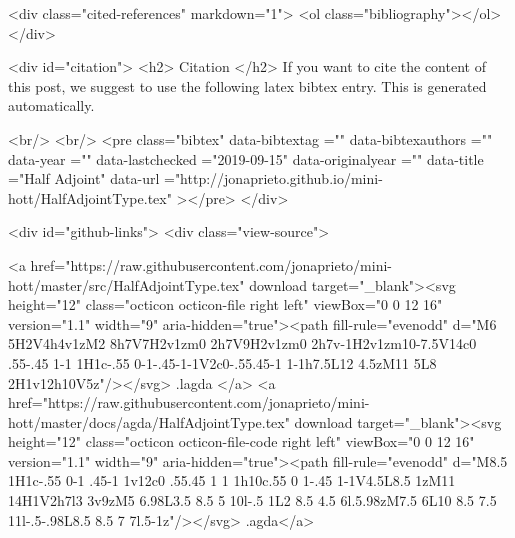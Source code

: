   <div class="cited-references" markdown="1">
  <ol class="bibliography"></ol>
  </div>


  
  <div id="citation">
  <h2> Citation </h2>
  If you want to cite the content of this post,
  we suggest to use the following latex bibtex entry.
  This is generated automatically.

  <br/>
  <br/>
  <pre class="bibtex"
       data-bibtextag =""
       data-bibtexauthors =""
       data-year =""
       data-lastchecked ="2019-09-15"
       data-originalyear =""
       data-title ="Half Adjoint"
       data-url ="http://jonaprieto.github.io/mini-hott/HalfAdjointType.tex"
  ></pre>
  </div>
  

  <div id="github-links">
    <div class="view-source">
      
        <a href="https://raw.githubusercontent.com/jonaprieto/mini-hott/master/src/HalfAdjointType.tex" download target="_blank"><svg height="12" class="octicon octicon-file right left" viewBox="0 0 12 16" version="1.1" width="9" aria-hidden="true"><path fill-rule="evenodd" d="M6 5H2V4h4v1zM2 8h7V7H2v1zm0 2h7V9H2v1zm0 2h7v-1H2v1zm10-7.5V14c0 .55-.45 1-1 1H1c-.55 0-1-.45-1-1V2c0-.55.45-1 1-1h7.5L12 4.5zM11 5L8 2H1v12h10V5z"/></svg> .lagda </a>
        <a href="https://raw.githubusercontent.com/jonaprieto/mini-hott/master/docs/agda/HalfAdjointType.tex" download target="_blank"><svg height="12" class="octicon octicon-file-code right left" viewBox="0 0 12 16" version="1.1" width="9" aria-hidden="true"><path fill-rule="evenodd" d="M8.5 1H1c-.55 0-1 .45-1 1v12c0 .55.45 1 1 1h10c.55 0 1-.45 1-1V4.5L8.5 1zM11 14H1V2h7l3 3v9zM5 6.98L3.5 8.5 5 10l-.5 1L2 8.5 4.5 6l.5.98zM7.5 6L10 8.5 7.5 11l-.5-.98L8.5 8.5 7 7l.5-1z"/></svg> .agda</a>
      
